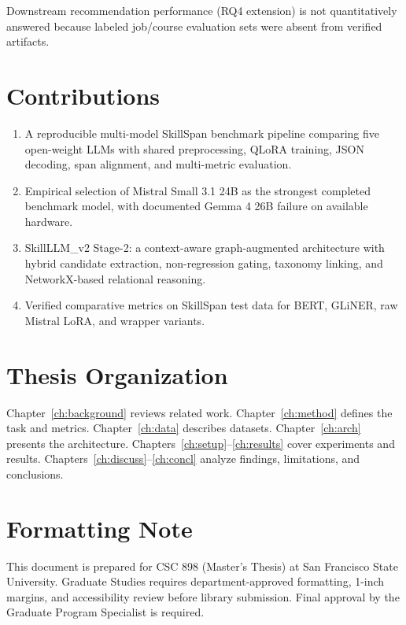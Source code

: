 \documentclass[12pt,oneside]{report}
\begin{document}
Downstream recommendation performance (RQ4 extension) is not quantitatively answered because labeled job/course evaluation sets were absent from verified artifacts.

\section{Contributions}

\begin{enumerate}
  \item A reproducible multi-model SkillSpan benchmark pipeline comparing five open-weight LLMs with shared preprocessing, QLoRA training, JSON decoding, span alignment, and multi-metric evaluation.
  \item Empirical selection of Mistral Small 3.1 24B as the strongest completed benchmark model, with documented Gemma 4 26B failure on available hardware.
  \item SkillLLM\_v2 Stage-2: a context-aware graph-augmented architecture with hybrid candidate extraction, non-regression gating, taxonomy linking, and NetworkX-based relational reasoning.
  \item Verified comparative metrics on SkillSpan test data for BERT, GLiNER, raw Mistral LoRA, and wrapper variants.
\end{enumerate}

\section{Thesis Organization}

Chapter~\ref{ch:background} reviews related work.
Chapter~\ref{ch:method} defines the task and metrics.
Chapter~\ref{ch:data} describes datasets.
Chapter~\ref{ch:arch} presents the architecture.
Chapters~\ref{ch:setup}--\ref{ch:results} cover experiments and results.
Chapters~\ref{ch:discuss}--\ref{ch:concl} analyze findings, limitations, and conclusions.

\section{Formatting Note}

This document is prepared for CSC 898 (Master's Thesis) at San Francisco State University.
Graduate Studies requires department-approved formatting, 1-inch margins, and accessibility review before library submission.
Final approval by the Graduate Program Specialist is required.

\end{document}
